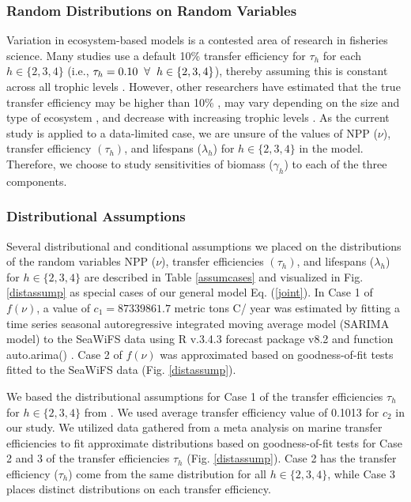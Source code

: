 \documentclass[oneside,12pt,final]{sty/ucthesis-CA2012}
\let\cite\citep                             %
\begin{document}
\begin{mainmatter}
\subsubsection*{Random Distributions on Random Variables}
Variation in ecosystem-based models is a contested area of research in fisheries science. Many studies use a default 10\% transfer efficiency for $\tau_h$ for each $h \in \{2, 3, 4\}$ (i.e., $\tau_h = 0.10 \hspace{2mm} \forall \hspace{2mm} h \in \{2, 3, 4\}$), thereby assuming this is constant across all trophic levels \cite{lindeman1942trophic, slobodkin1962energy, may1976theoretical, pauly1995primary}. However, other researchers have estimated that the true transfer efficiency may be higher than 10\% \cite{schaefer1965potential, ryther1969photosynthesis,sheldon1977structure, baumann1995comment}, may vary depending on the size and type of ecosystem \cite{libralato2008novel, heymans2011ecopath}, and decrease with increasing trophic levels \cite{may1983ecology, barnes2010global}. As the current study is applied to a data-limited case, we are unsure of the values of NPP ($\nu$), transfer efficiency $(\tau_h)$, and lifespans ($\lambda_h$) for $h \in \{2, 3, 4\}$ in the model. Therefore, we choose to study sensitivities of biomass ($\gamma_h$) to each of the three components.

\subsubsection*{Distributional Assumptions}
Several distributional and conditional assumptions we placed on the distributions of the random variables NPP ($\nu$), transfer efficiencies $(\tau_h)$, and lifespans ($\lambda_h$) for $h \in \{2, 3, 4\}$ are described in Table \ref{assumcases} and visualized in Fig. \ref{distassump} as special cases of our general model Eq. (\ref{joint}). In Case 1 of $f(\nu)$, a value of $c_1 = 87339861.7$ metric tons C/ year was estimated by fitting a time series seasonal autoregressive integrated moving average model (SARIMA model) to the SeaWiFS data using R v.3.4.3 \cite{Rcite} forecast package v8.2 and function auto.arima() \cite{forecast1, forecast2}. Case 2 of $f(\nu)$ was approximated based on goodness-of-fit tests fitted to the SeaWiFS data \cite{fitdistrplus} (Fig. \ref{distassump}). 

\vspace{5mm}

We based the distributional assumptions for Case 1 of the transfer efficiencies $\tau_h$ for $h \in \{2, 3, 4\}$ from \citet{pauly1995primary}. We used \citet{pauly1995primary} average transfer efficiency value of 0.1013 for $c_2$ in our study. We utilized data gathered from a meta analysis on marine transfer efficiencies to fit approximate distributions based on goodness-of-fit tests \cite{fitdistrplus} for Case 2 and 3 of the transfer efficiencies $\tau_h$ (Fig. \ref{distassump}). Case 2 has the transfer efficiency ($\tau_h$) come from the same distribution for all $h \in \{2, 3, 4\}$, while Case 3 places distinct distributions on each transfer efficiency.


\end{mainmatter}
\end{document}
